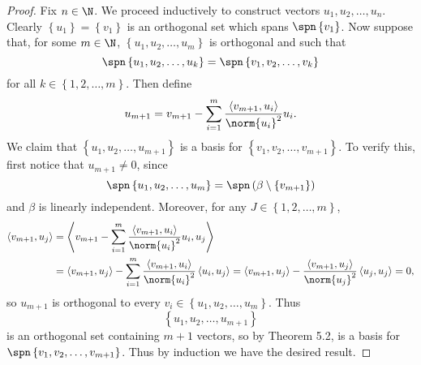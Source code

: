 \documentclass[linearalgebraII]{subfiles}
\begin{document}
    \begin{proof}
        Fix $n\in\N$. We proceed inductively to construct vectors $u_1,u_2,\ldots,u_n$. Clearly $\left\lbrace u_1 \right\rbrace = \left\lbrace v_1 \right\rbrace $ is an orthogonal set which spans $\spn\left\lbrace v_1 \right\rbrace$. Now suppose that, for some $m\in\N$, $\left\lbrace u_1,u_2,\ldots,u_m \right\rbrace$ is orthogonal and such that
        \begin{equation*}
            \spn\left\lbrace u_1,u_2,\ldots,u_k \right\rbrace = \spn\left\lbrace v_1,v_2,\ldots,v_k \right\rbrace 
        \end{equation*}
        for all $k\in\left\lbrace 1,2,\ldots,m \right\rbrace$. Then define
        \begin{equation*}
            u_{m+1} = v_{m+1} - \sum^{m}_{i=1} \frac{\left\langle v_{m+1}, u_i\right\rangle }{\norm{u_i}^2} u_i.
        \end{equation*}
        We claim that $\left\lbrace u_1,u_2,\ldots,u_{m+1} \right\rbrace$ is a basis for $\left\lbrace v_1,v_2,\ldots,v_{m+1} \right\rbrace$. To verify this, first notice that $u_{m+1}\neq 0$, since
        \begin{equation*}
            \spn\left\lbrace u_1,u_2,\ldots,u_m \right\rbrace = \spn\left( \beta\setminus \left\lbrace v_{m+1} \right\rbrace  \right) 
        \end{equation*}
        and $\beta$ is linearly independent. Moreover, for any $J\in\left\lbrace 1,2,\ldots,m \right\rbrace$,
        \begin{align*}
            \left\langle v_{m+1}, u_j\right\rangle & = \left\langle v_{m+1} - \sum^{m}_{i=1} \frac{\left\langle v_{m+1}, u_i\right\rangle }{\norm{u_i}^2} u_i, u_j\right\rangle \\
                                                   & = \left\langle v_{m+1}, u_j\right\rangle - \sum^{m}_{i=1} \frac{\left\langle v_{m+1}, u_i\right\rangle }{\norm{u_i}^2} \left\langle u_i, u_j\right\rangle = \left\langle v_{m+1}, u_j\right\rangle - \frac{\left\langle v_{m+1}, u_j\right\rangle }{\norm{u_j}^2} \left\langle u_j, u_j\right\rangle = 0,
        \end{align*} 
        so $u_{m+1}$ is orthogonal to every $v_i\in\left\lbrace u_1,u_2,\ldots,u_m \right\rbrace$. Thus
        \begin{equation*}
            \left\lbrace u_1,u_2,\ldots,u_{m+1} \right\rbrace 
        \end{equation*}
        is an orthogonal set containing $m+1$ vectors, so by Theorem 5.2, is a basis for $\spn\left\lbrace v_1,v_2,\ldots,v_{m+1} \right\rbrace$. Thus by induction we have the desired result.
    \end{proof}
\end{document}

